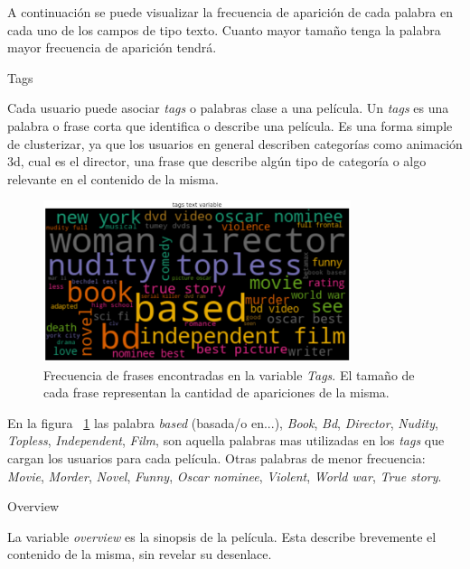 \documentclass[11pt,a4paper,twoside]{thesis}
\begin{document}
A continuación se puede visualizar la frecuencia de aparición de cada palabra en cada uno de los campos de tipo texto. Cuanto mayor tamaño tenga la palabra mayor frecuencia de aparición tendrá.

\begin{description}
	\item[Tags]
\end{description}

Cada usuario puede asociar \textit{tags} o palabras clase a una película. Un \textit{tags} es una palabra o frase corta que identifica o describe una película. Es una forma simple de clusterizar, ya que los usuarios en general describen categorías como animación 3d, cual es el director, una frase que describe algún tipo de categoría o algo relevante en el contenido de la misma. 

\begin{figure}[h!]
	\centering
	\includegraphics[width=9cm]{./images/Cloud-tags.png}
	\caption{Frecuencia de frases encontradas en la variable \textit{Tags}. El tamaño de cada frase representan la cantidad de apariciones de la misma.}
	\label{fig:tagsCloud}
\end{figure}	


En la figura ~\ref{fig:tagsCloud} las palabra \textit{based} (basada/o en...), \textit{Book}, \textit{Bd}, \textit{Director}, \textit{Nudity}, \textit{Topless}, \textit{Independent}, \textit{Film}, son aquella palabras mas utilizadas en los \textit{tags} que cargan los usuarios para cada película. Otras palabras de menor frecuencia: \textit{Movie}, \textit{Morder}, \textit{Novel}, \textit{Funny}, \textit{Oscar nominee}, \textit{Violent}, \textit{World war}, \textit{True story}.


\clearpage

\begin{description}
	\item[Overview]
\end{description}

La variable \textit{overview} es la sinopsis de la película. Esta describe brevemente el contenido de la misma, sin revelar su desenlace.
\end{document}
